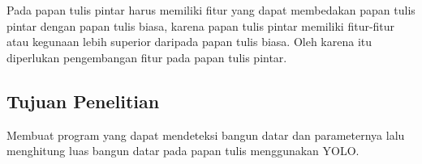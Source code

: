 Pada papan tulis pintar harus memiliki fitur yang dapat membedakan papan tulis pintar dengan papan tulis biasa, karena papan tulis pintar memiliki fitur-fitur atau kegunaan lebih superior daripada papan tulis biasa. Oleh karena itu diperlukan pengembangan fitur pada papan tulis pintar. 


\subsection{Tujuan Penelitian}

Membuat program yang dapat mendeteksi bangun datar dan parameternya lalu menghitung luas bangun datar pada papan tulis menggunakan YOLO.